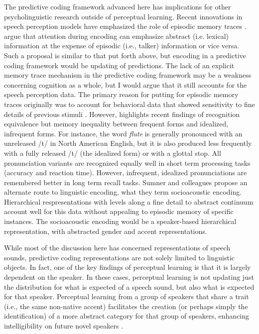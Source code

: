 The predictive coding framework advanced here has implications for other psycholinguistic research outside of perceptual learning.
Recent innovations in speech perception models have emphasized the role of episodic memory traces \citep{Goldinger1996,Pierrehumbert2001}.
\citet{Theodore2015} argue that attention during encoding can emphasize abstract (i.e. lexical) information at the expense of episodic (i.e., talker) information or vice versa.
Such a proposal is similar to that put forth above, but encoding in a predictive coding framework would be updating of predictions.
The lack of an explicit memory trace mechanism in the predictive coding framework may be a weakness concerning cognition as a whole, but I would argue that it still accounts for the speech perception data.
The primary reason for putting for episodic memory traces originally was to account for behavioral data that showed sensitivity to fine details of previous stimuli \citep{Goldinger1996}.
However, \citet{Sumner2013} highlights recent findings of recognition equivalence but memory inequality between frequent forms and idealized, infrequent forms.
For instance, the word \emph{flute} is generally pronounced with an unreleased /t/ in North American English, but it is also produced less frequently with a fully released /t/ (the idealized form) or with a glottal stop.
All pronunciation variants are recognized equally well in short term processing tasks (accuracy and reaction time).
However, infrequent, idealized pronunciations are remembered better in long term recall tasks.
Sumner and colleagues propose an alternate route to linguistic encoding, what they term socioacoustic encoding.
Hierarchical respresentations with levels along a fine detail to abstract continuum account well for this data without appealing to episodic memory of specific instances.
The socioacoustic encoding would be a speaker-based hierarchical representation, with abstracted gender and accent representations.

While most of the discussion here has concerned representations of speech sounds, predictive coding representations are not solely limited to linguistic objects.
In fact, one of the key findings of perceptual learning is that it is largely dependent on the speaker.
In these cases, perceptual learning is not updating just the distribution for what is expected of a speech sound, but also what is expected for that speaker.
Perceptual learning from a group of speakers that share a trait (i.e., the same non-native accent) facilitates the creation (or perhaps simply the identification) of a more abstract category for that group of speakers, enhancing intelligibility on future novel speakers \citep{Bradlow2008}.

